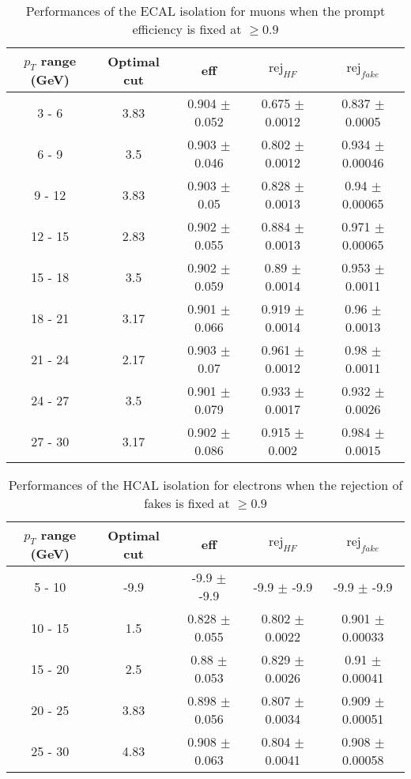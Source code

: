 \begin{table}[htbp]
   \centering
   \begin{tabular}{|c|c|c|c|c|}
      \hline
      $p_T$ range (GeV) & Optimal cut & eff & $\textrm{rej}_{HF}$ & $\textrm{rej}_{fake}$ \\
      \hline
      3 - 6 & 3.83 & 0.904 $\pm$ 0.052 & 0.675 $\pm$ 0.0012 & 0.837 $\pm$ 0.0005 \\
      \hline
      6 - 9 & 3.5 & 0.903 $\pm$ 0.046 & 0.802 $\pm$ 0.0012 & 0.934 $\pm$ 0.00046 \\
      \hline
      9 - 12 & 3.83 & 0.903 $\pm$ 0.05 & 0.828 $\pm$ 0.0013 & 0.94 $\pm$ 0.00065 \\
      \hline
      12 - 15 & 2.83 & 0.902 $\pm$ 0.055 & 0.884 $\pm$ 0.0013 & 0.971 $\pm$ 0.00065 \\
      \hline
      15 - 18 & 3.5 & 0.902 $\pm$ 0.059 & 0.89 $\pm$ 0.0014 & 0.953 $\pm$ 0.0011 \\
      \hline
      18 - 21 & 3.17 & 0.901 $\pm$ 0.066 & 0.919 $\pm$ 0.0014 & 0.96 $\pm$ 0.0013 \\
      \hline
      21 - 24 & 2.17 & 0.903 $\pm$ 0.07 & 0.961 $\pm$ 0.0012 & 0.98 $\pm$ 0.0011 \\
      \hline
      24 - 27 & 3.5 & 0.901 $\pm$ 0.079 & 0.933 $\pm$ 0.0017 & 0.932 $\pm$ 0.0026 \\
      \hline
      27 - 30 & 3.17 & 0.902 $\pm$ 0.086 & 0.915 $\pm$ 0.002 & 0.984 $\pm$ 0.0015 \\
      \hline
   \end{tabular}
   \caption{\small{Performances of the ECAL isolation for muons when the prompt efficiency is fixed at $\geq 0.9$}\label{tab:ecal_muon_eff}}
\end{table}






\begin{table}[htbp]
   \centering
   \begin{tabular}{|c|c|c|c|c|}
      \hline
      $p_T$ range (GeV) & Optimal cut & eff & $\textrm{rej}_{HF}$ & $\textrm{rej}_{fake}$ \\
      \hline
      5 - 10 & -9.9 & -9.9 $\pm$ -9.9 & -9.9 $\pm$ -9.9 & -9.9 $\pm$ -9.9 \\
      \hline
      10 - 15 & 1.5 & 0.828 $\pm$ 0.055 & 0.802 $\pm$ 0.0022 & 0.901 $\pm$ 0.00033 \\
      \hline
      15 - 20 & 2.5 & 0.88 $\pm$ 0.053 & 0.829 $\pm$ 0.0026 & 0.91 $\pm$ 0.00041 \\
      \hline
      20 - 25 & 3.83 & 0.898 $\pm$ 0.056 & 0.807 $\pm$ 0.0034 & 0.909 $\pm$ 0.00051 \\
      \hline
      25 - 30 & 4.83 & 0.908 $\pm$ 0.063 & 0.804 $\pm$ 0.0041 & 0.908 $\pm$ 0.00058 \\
      \hline
   \end{tabular}
   \caption{\small{Performances of the HCAL isolation for electrons when the rejection of fakes is fixed at $\geq 0.9$}\label{tab:hcal_elec_pureFake}}
\end{table}






